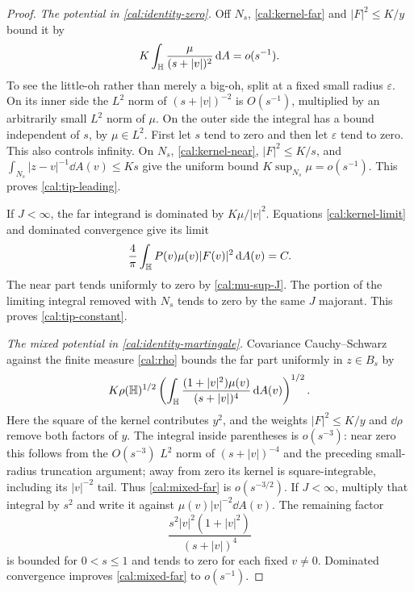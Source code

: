 \begin{proof}
\smallskip\noindent
\emph{The potential in \eqref{cal:identity-zero}.}
Off $N_s$, \eqref{cal:kernel-far} and $|F|^2\leq K/y$ bound it by
\[
 K\int_{\mathbb H}\frac\mu{(s+|v|)^2}\,\mathrm d A=o(s^{-1}).
\]
To see the little-oh rather than merely a big-oh, split at a fixed
small radius $\varepsilon$.  On its inner side the $L^2$ norm of
$(s+|v|)^{-2}$ is $O(s^{-1})$, multiplied by an arbitrarily small
$L^2$ norm of $\mu$.  On the outer side the integral has a bound
independent of $s$, by $\mu\in L^2$.  First let $s$ tend to zero and
then let $\varepsilon$ tend to zero.  This also controls infinity.
On $N_s$, \eqref{cal:kernel-near}, $|F|^2\leq K/s$, and
$\int_{N_s}|z-v|^{-1}\dd A(v)\leq Ks$ give the uniform bound
$K\sup_{N_s}\mu=o(s^{-1})$.  This proves
\eqref{cal:tip-leading}.

If $J<\infty$, the far integrand is dominated by $K\mu/|v|^2$.
Equations \eqref{cal:kernel-limit} and dominated convergence give its
limit
\[
 \frac4\pi\int_{\mathbb H}P(v)\mu(v)|F(v)|^2\,\mathrm d A(v)=C.
\]
The near part tends uniformly to zero by
\eqref{cal:mu-sup-J}.  The portion of the limiting integral removed
with $N_s$ tends to zero by the same $J$ majorant.  This proves
\eqref{cal:tip-constant}.

\smallskip\noindent
\emph{The mixed potential in \eqref{cal:identity-martingale}.}
Covariance Cauchy--Schwarz against the finite measure \eqref{cal:rho}
bounds the far part uniformly in $z\in B_s$ by
\begin{equation}
 K\rho(\mathbb H)^{1/2}
 \left(\int_{\mathbb H}\frac{(1+|v|^2)\mu(v)}{(s+|v|)^4}
                                             \,\mathrm d A(v)\right)^{1/2}.
 \label{cal:mixed-far}
\end{equation}
Here the square of the kernel contributes $y^2$, and the weights
$|F|^2\leq K/y$ and $\dd\rho$ remove both factors of $y$.
The integral inside parentheses is $o(s^{-3})$: near zero this follows
from the $O(s^{-3})$ $L^2$ norm of $(s+|v|)^{-4}$ and the preceding
small-radius truncation argument; away from zero its kernel is
square-integrable, including its $|v|^{-2}$ tail.  Thus
\eqref{cal:mixed-far} is $o(s^{-3/2})$.
If $J<\infty$, multiply that integral by $s^2$ and write it against
$\mu(v)|v|^{-2}\dd A(v)$.  The remaining factor
\[
 \frac{s^2|v|^2(1+|v|^2)}{(s+|v|)^4}
\]
is bounded for $0<s\leq1$ and tends to zero for each fixed $v\ne0$.
Dominated convergence improves \eqref{cal:mixed-far} to $o(s^{-1})$.


\end{proof}
